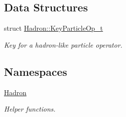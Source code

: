 \subsection*{Data Structures}
\begin{DoxyCompactItemize}
\item 
struct \mbox{\hyperlink{structHadron_1_1KeyParticleOp__t}{Hadron\+::\+Key\+Particle\+Op\+\_\+t}}
\begin{DoxyCompactList}\small\item\em Key for a hadron-\/like particle operator. \end{DoxyCompactList}\end{DoxyCompactItemize}
\subsection*{Namespaces}
\begin{DoxyCompactItemize}
\item 
 \mbox{\hyperlink{namespaceHadron}{Hadron}}
\begin{DoxyCompactList}\small\item\em Helper functions. \end{DoxyCompactList}\end{DoxyCompactItemize}
